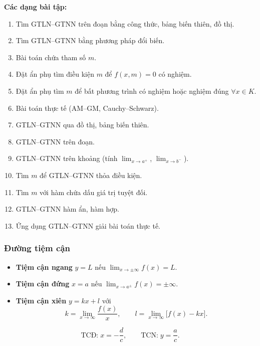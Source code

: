\documentclass[12pt,a4paper]{article}
\begin{document}
\medskip\noindent\textbf{Các dạng bài tập:}
\begin{enumerate}[label=\textbf{Dạng \arabic*:}, leftmargin=*, align=left]
  \item Tìm GTLN--GTNN trên đoạn bằng công thức, bảng biến thiên, đồ thị.
  \item Tìm GTLN--GTNN bằng phương pháp đổi biến.
  \item Bài toán chứa tham số $m$.
  \item Đặt ẩn phụ tìm điều kiện $m$ để $f(x,m) = 0$ có nghiệm.
  \item Đặt ẩn phụ tìm $m$ để bất phương trình có nghiệm hoặc nghiệm đúng $\forall x \in K$.
  \item Bài toán thực tế (AM--GM, Cauchy--Schwarz).
  \item GTLN--GTNN qua đồ thị, bảng biến thiên.
  \item GTLN--GTNN trên đoạn.
  \item GTLN--GTNN trên khoảng (tính $\lim_{x \to a^+}$, $\lim_{x \to b^-}$).
  \item Tìm $m$ để GTLN--GTNN thỏa điều kiện.
  \item Tìm $m$ với hàm chứa dấu giá trị tuyệt đối.
  \item GTLN--GTNN hàm ẩn, hàm hợp.
  \item Ứng dụng GTLN--GTNN giải bài toán thực tế.
\end{enumerate}

\subsubsection{Đường tiệm cận}

\begin{dinhnghia}
  \begin{itemize}
    \item \textbf{Tiệm cận ngang} $y = L$\; nếu $\displaystyle\lim_{x \to \pm\infty} f(x) = L$.
    \item \textbf{Tiệm cận đứng} $x = a$\; nếu $\displaystyle\lim_{x \to a^{\pm}} f(x) = \pm\infty$.
    \item \textbf{Tiệm cận xiên} $y = kx + l$ với
      \[
        k = \lim_{x \to \infty} \frac{f(x)}{x}, \qquad
        l = \lim_{x \to \infty} \bigl[f(x) - kx\bigr].
      \]
  \end{itemize}
\end{dinhnghia}

\begin{congthuc}[title={Hàm phân thức $y = \dfrac{ax + b}{cx + d}$ \;$(c \ne 0,\; ad - bc \ne 0)$}]
  \[
    \text{TCĐ:}\; x = -\frac{d}{c}, \qquad
    \text{TCN:}\; y = \frac{a}{c}.
  \]
\end{congthuc}
\end{document}
